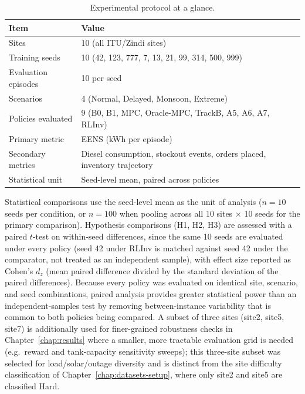 \begin{table}[htb]
\centering
\small
\caption{Experimental protocol at a glance.}
\label{tab:protocol_summary}
\begin{tabular}{lp{10.5cm}}
\toprule
\textbf{Item} & \textbf{Value} \\
\midrule
Sites                & 10 (all ITU/Zindi sites) \\
Training seeds       & 10 (42, 123, 777, 7, 13, 21, 99, 314, 500, 999) \\
Evaluation episodes  & 10 per seed \\
Scenarios            & 4 (Normal, Delayed, Monsoon, Extreme) \\
Policies evaluated   & 9 (B0, B1, MPC, Oracle-MPC, TrackB, A5, A6, A7, RLInv) \\
Primary metric       & EENS (kWh per episode) \\
Secondary metrics    & Diesel consumption, stockout events, orders placed, inventory trajectory \\
Statistical unit     & Seed-level mean, paired across policies \\
\bottomrule
\end{tabular}
\end{table}

Statistical comparisons use the seed-level mean as the unit of analysis
($n=10$ seeds per condition, or $n=100$ when pooling across all 10 sites
$\times$ 10 seeds for the primary comparison). Hypothesis comparisons
(H1, H2, H3) are assessed with a paired $t$-test on within-seed
differences, since the same 10 seeds are evaluated under every policy
(seed 42 under RLInv is matched against seed 42 under the comparator, not
treated as an independent sample), with effect size reported as Cohen's
$d_z$ (mean paired difference divided by the standard deviation of the
paired differences). Because every policy was evaluated on identical
site, scenario, and seed combinations, paired analysis provides greater
statistical power than an independent-samples test by removing
between-instance variability that is common to both policies being
compared. A subset of three sites (site2, site5, site7) is
additionally used for finer-grained robustness checks in
Chapter~\ref{chap:results} where a smaller, more tractable evaluation
grid is needed (e.g.\ reward and tank-capacity sensitivity sweeps); this
three-site subset was selected for load/solar/outage diversity and is
distinct from the site difficulty classification of
Chapter~\ref{chap:datasets-setup}, where only site2 and site5 are
classified Hard.

